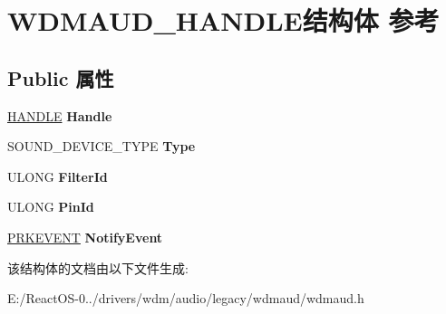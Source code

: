 \hypertarget{struct_w_d_m_a_u_d___h_a_n_d_l_e}{}\section{W\+D\+M\+A\+U\+D\+\_\+\+H\+A\+N\+D\+L\+E结构体 参考}
\label{struct_w_d_m_a_u_d___h_a_n_d_l_e}
\subsection*{Public 属性}
\begin{DoxyCompactItemize}
\item 
\mbox{\label{struct_w_d_m_a_u_d___h_a_n_d_l_e_ae6b7ad70bd12522333ea43f12d14997e}} 
\hyperlink{interfacevoid}{H\+A\+N\+D\+LE} {\bfseries Handle}
\item 
\mbox{\label{struct_w_d_m_a_u_d___h_a_n_d_l_e_ac719e12ead14031742e7ca279b8f2708}} 
S\+O\+U\+N\+D\+\_\+\+D\+E\+V\+I\+C\+E\+\_\+\+T\+Y\+PE {\bfseries Type}
\item 
\mbox{\label{struct_w_d_m_a_u_d___h_a_n_d_l_e_a9288f00a89bf5d7fc4f9ce2e9b755df7}} 
U\+L\+O\+NG {\bfseries Filter\+Id}
\item 
\mbox{\label{struct_w_d_m_a_u_d___h_a_n_d_l_e_af571eb0e6e9c0eb2e5e39940d09de8fb}} 
U\+L\+O\+NG {\bfseries Pin\+Id}
\item 
\mbox{\label{struct_w_d_m_a_u_d___h_a_n_d_l_e_a60f24c90695bbdb77e582f9da1a9ac42}} 
\hyperlink{struct___k_e_v_e_n_t}{P\+R\+K\+E\+V\+E\+NT} {\bfseries Notify\+Event}
\end{DoxyCompactItemize}


该结构体的文档由以下文件生成\+:\begin{DoxyCompactItemize}
\item 
E\+:/\+React\+O\+S-\/0../drivers/wdm/audio/legacy/wdmaud/wdmaud.\+h\end{DoxyCompactItemize}
